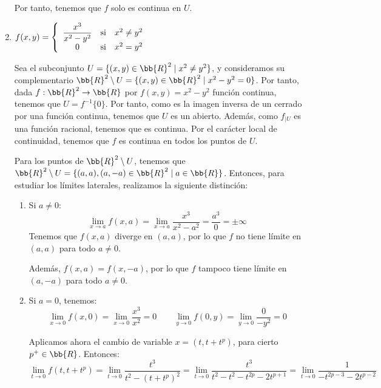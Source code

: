 \begin{ejercicio}
\begin{enumerate}
        Por tanto, tenemos que $f$ solo es continua en $U$.

        \item $\displaystyle
            f(x,y)=
            \left\{\begin{array}{ccc}
                \displaystyle \frac{x^3}{x^2-y^2} &\text{si}& x^2\neq y^2\\
                0 &\text{si}& x^2=y^2
            \end{array}\right. \displaystyle$

        Sea el subconjunto $U=\{(x,y)\in \bb{R}^2\mid x^2\neq y^2\}$, y consideramos su complementario $\bb{R}^2\setminus U=\{(x,y)\in \bb{R}^2\mid x^2-y^2=0\}$. Por tanto, dada $f:\bb{R}^2\to \bb{R}$ por $f(x,y)=x^2-y^2$ función continua, tenemos que $U=f^{-1}\{0\}$. Por tanto, como es la imagen inversa de un cerrado por una función continua, tenemos que $U$ es un abierto. Además, como $f_{\big|U}$ es una función racional, tenemos que es continua. Por el carácter local de continuidad, tenemos que $f$ es continua en todos los puntos de $U$.

        Para los puntos de $\bb{R}^2\setminus U$, tenemos que $\bb{R}^2\setminus U=\{(a,a), (a,-a)\in \bb{R}^2\mid a\in \bb{R}\}$. Entonces, para estudiar los límites laterales, realizamos la siguiente distinción:
        \begin{enumerate}
            \item Si $a\neq 0$:
            \begin{equation*}
                \lim_{x\to a}f(x,a)=
                \lim_{x\to a}\frac{x^3}{x^2-a^2} = \frac{a^3}{0}=\pm \infty
            \end{equation*}
            Tenemos que $f(x,a)$ diverge en $(a,a)$, por lo que $f$ no tiene límite en $(a,a)$ para todo $a\neq 0$.

            Además, $f(x,a)=f(x,-a)$, por lo que $f$ tampoco tiene límite en $(a,-a)$ para todo $a\neq 0$.

            \item Si $a=0$, tenemos:
            \begin{equation*}
                \lim_{x\to 0}f(x,0)=
                \lim_{x\to 0}\frac{x^3}{x^2} =0
                \qquad
                \lim_{y\to 0}f(0,y)=
                \lim_{y\to 0}\frac{0}{-y^2} =0
            \end{equation*}
            
            Aplicamos ahora el cambio de variable $x=(t,t+t^p)$, para cierto $p^+\in \bb{R}$. Entonces:
            \begin{equation*}
                \lim_{t \to 0}f(t,t+t^p) = 
                \lim_{t \to 0} \frac{t^3}{t^2-(t+t^p)^2} =
                \lim_{t \to 0} \frac{t^3}{t^2-t^2-t^{2p} -2t^{p+1}}=
                \lim_{t \to 0} \frac{1}{-t^{2p-3} -2t^{p-2}}
            \end{equation*}


\end{enumerate}
\end{enumerate}
\end{ejercicio}
